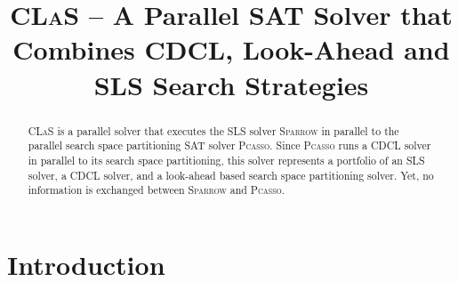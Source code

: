 \documentclass[conference]{IEEEtran}
\begin{document}
	
\title{\textsc{CLaS} -- A Parallel SAT Solver that Combines CDCL, Look-Ahead and SLS Search Strategies}


\author{
\and
 \and
 \and
{}
}



\def\cp{\textsc{Coprocessor}\xspace}
\def\glucose{\textsc{Glucose~2.2}\xspace}
\def\minisat{\textsc{Minisat~2.2}\xspace}
\def\riss{\textsc{Riss}\xspace}
\def\pcasso{\textsc{PCasso}\xspace}
\def\sparrow{\textsc{Sparrow}\xspace}
\def\scp{\textsc{Sparrow+CP3}\xspace}
\def\str{\textsc{SparrowToRiss}\xspace}
\def\clas{\textsc{CLaS}\xspace}

\newcommand{\nnote}[1]{$[$\textcolor{darkred}{norbert}:~~\emph{\textcolor{midgrey}{#1}}$]$}

\maketitle

\begin{abstract}
\clas is a parallel solver that executes the SLS solver \textsc{Sparrow} in parallel to the parallel search space partitioning SAT solver \textsc{Pcasso}. 
Since \textsc{Pcasso} runs a CDCL solver in parallel to its search space partitioning, this solver represents a portfolio of an SLS solver, a CDCL solver, and a look-ahead based search space partitioning solver. 
Yet, no information is exchanged between \textsc{Sparrow} and \textsc{Pcasso}. 
\end{abstract}

\section{Introduction}
\end{document}
